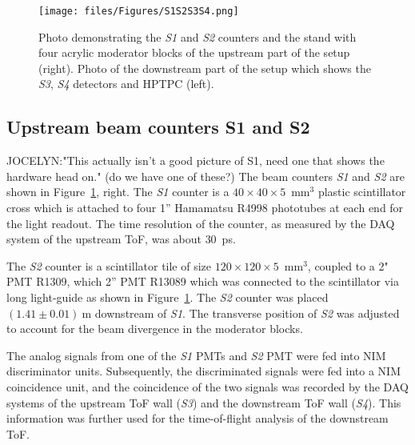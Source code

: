 \begin{figure}[t]
  \centering
  \texttt{[image: files/Figures/S1S2S3S4.png]}
  \caption{Photo demonstrating the \textit{S1} and \textit{S2} counters and the stand with four acrylic moderator blocks of the upstream part of the setup (right). Photo of the downstream part of the setup which shows the \textit{S3}, \textit{S4} detectors and HPTPC (left).}
  \label{fig:modblocks}
\end{figure}

\subsection{Upstream beam counters S1 and S2}
\label{subsec:s1s2Exp}
JOCELYN:"This actually isn't a good picture of S1, need one that shows the hardware head on." (do we have one of these?)
The beam counters \textit{S1} and \textit{S2} are shown in Figure~\ref{fig:modblocks}, right.
The \textit{S1} counter is a $40\times40\times5$~mm$^3$ plastic scintillator cross which is attached to four 1'' Hamamatsu R4998 phototubes at each end for the light readout.
The time resolution of the counter, as measured by the DAQ system of the upstream ToF, was about 30~ps. 

The \textit{S2} counter is a scintillator tile of size $120\times120\times5$~mm$^3$, coupled to a 2" PMT R1309, which  2'' PMT R13089 which was connected to the scintillator via long light-guide as shown in Figure~\ref{fig:modblocks}.
The \textit{S2} counter was placed $(1.41 \pm 0.01)~\text{m}$  downstream of \textit{S1}.
The transverse position of \textit{S2} was adjusted to account for the beam divergence in the moderator blocks.

The analog signals from one of the \textit{S1} PMTs and \textit{S2} PMT were fed into NIM discriminator units.
Subsequently, the discriminated signals were fed into a NIM coincidence unit, and the coincidence of the two signals was recorded by the DAQ systems of the upstream ToF wall (\textit{S3}) and the downstream ToF wall (\textit{S4}). This information was further used for the time-of-flight analysis of the downstream ToF. 


